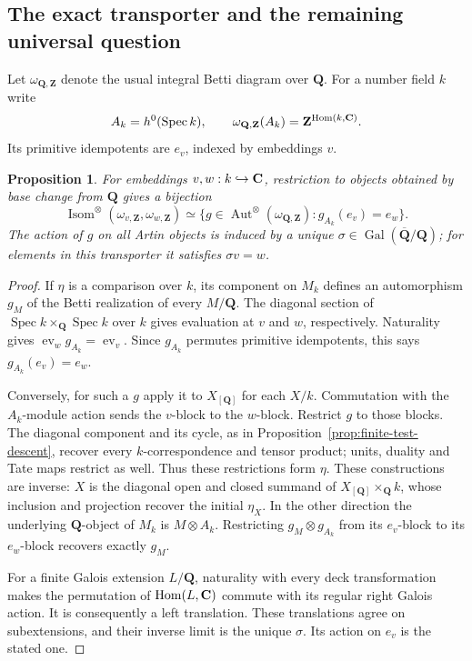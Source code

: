 \documentclass[11pt]{article}
\newtheorem{proposition}[theorem]{Proposition}
\theoremstyle{definition}\newtheorem{definition}[theorem]{Definition}
\theoremstyle{remark}\newtheorem{remark}[theorem]{Remark}
\newcommand{\Q}{\mathbf Q}\newcommand{\Z}{\mathbf Z}
\newcommand{\Qb}{\overline{\mathbf Q}}\newcommand{\Fp}{\mathbf F_p}
\DeclareMathOperator{\Aut}{Aut}\DeclareMathOperator{\Isom}{Isom}
\DeclareMathOperator{\Gal}{Gal}\DeclareMathOperator{\im}{im}
\begin{document}
\subsection{The exact transporter and the remaining universal question}
Let $\omega_{\Q,\Z}$ denote the usual integral Betti diagram over $\Q$.
For a number field $k$ write
\[
 A_k=h^0(\operatorname{Spec}k),\qquad
 \omega_{\Q,\Z}(A_k)=\Z^{\operatorname{Hom}(k,\C)}.
\]
Its primitive idempotents are $e_v$, indexed by embeddings $v$.

\begin{proposition}\label{prop:exact-transporter}
For embeddings $v,w:k\hookrightarrow\mathbf C$, restriction to objects obtained
by base change from $\Q$ gives a bijection
\[
 \Isom^\otimes(\omega_{v,\Z},\omega_{w,\Z})
 \simeq
 \{g\in\Aut^\otimes(\omega_{\Q,\Z}):g_{A_k}(e_v)=e_w\}.
\]
The action of $g$ on all Artin objects is induced by a unique
$\sigma\in\Gal(\Qb/\Q)$; for elements in this transporter it satisfies
$\sigma v=w$.
\end{proposition}
\begin{proof}
If $\eta$ is a comparison over $k$, its component on $M_k$ defines an
automorphism $g_M$ of the Betti realization of every $M/\Q$.
The diagonal section of $\operatorname{Spec}k\times_\Q\operatorname{Spec}k$
over $k$ gives evaluation at $v$ and $w$, respectively. Naturality gives
$\operatorname{ev}_w g_{A_k}=\operatorname{ev}_v$. Since $g_{A_k}$ permutes
primitive idempotents, this says $g_{A_k}(e_v)=e_w$.

Conversely, for such a $g$ apply it to $X_{[\Q]}$ for each $X/k$.
Commutation with the $A_k$-module action sends the $v$-block to the
$w$-block. Restrict $g$ to those blocks. The diagonal component and its
cycle, as in Proposition~\ref{prop:finite-test-descent}, recover every
$k$-correspondence and tensor product; units, duality and Tate maps
restrict as well. Thus these restrictions form $\eta$.
These constructions are inverse: $X$ is the diagonal open and closed
summand of $X_{[\Q]}\times_\Q k$, whose inclusion and projection recover
the initial $\eta_X$. In the other direction the underlying $\Q$-object
of $M_k$ is $M\otimes A_k$. Restricting $g_M\otimes g_{A_k}$ from its
$e_v$-block to its $e_w$-block recovers exactly $g_M$.

For a finite Galois extension $L/\Q$, naturality with every deck
transformation makes the permutation of $\operatorname{Hom}(L,\mathbf C)$
commute with its regular right Galois action. It is consequently a left
translation. These translations agree on subextensions, and their
inverse limit is the unique $\sigma$. Its action on $e_v$ is the stated one.
\end{proof}
\end{document}
